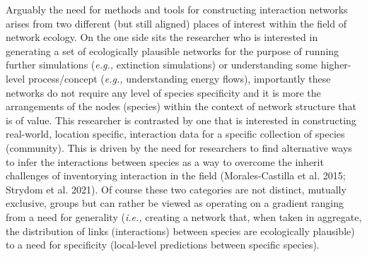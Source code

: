 \documentclass[
  letterpaper,
  DIV=11,
  numbers=noendperiod]{scrartcl}
\begin{document}
Arguably the need for methods and tools for constructing interaction
networks arises from two different (but still aligned) places of
interest within the field of network ecology. On the one side sits the
researcher who is interested in generating a set of ecologically
plausible networks for the purpose of running further simulations
(\emph{e.g.,} extinction simulations) or understanding some higher-level
process/concept (\emph{e.g.,} understanding energy flows), importantly
these networks do not require any level of species specificity and it is
more the arrangements of the nodes (species) within the context of
network structure that is of value. This researcher is contrasted by one
that is interested in constructing real-world, location specific,
interaction data for a specific collection of species (community). This
is driven by the need for researchers to find alternative ways to infer
the interactions between species as a way to overcome the inherit
challenges of inventorying interaction in the field (Morales-Castilla et
al. 2015; Strydom et al. 2021). Of course these two categories are not
distinct, mutually exclusive, groups but can rather be viewed as
operating on a gradient ranging from a need for generality (\emph{i.e.,}
creating a network that, when taken in aggregate, the distribution of
links (interactions) between species are ecologically plausible) to a
need for specificity (local-level predictions between specific species).
\end{document}
